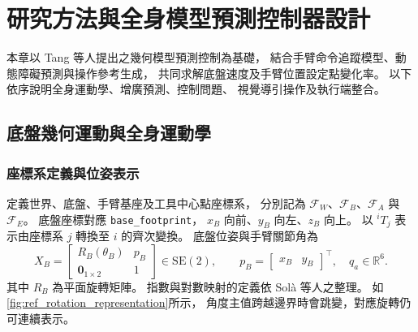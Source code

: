 \chapter{研究方法與全身模型預測控制器設計}
\label{c:methodology}
\label{c:Mathodology}

本章以 Tang 等人\cite{tang2024gmpc}提出之幾何模型預測控制為基礎，
結合手臂命令追蹤模型、動態障礙預測與操作參考生成，
共同求解底盤速度及手臂位置設定點變化率。
以下依序說明全身運動學、增廣預測、控制問題、
視覺導引操作及執行端整合。

\section{底盤幾何運動與全身運動學}
\label{sec:wholebody_kinematics}

\subsection{座標系定義與位姿表示}
\label{subsec:frames_pose_representation}

定義世界、底盤、手臂基座及工具中心點座標系，
分別記為 $\mathcal F_W$、$\mathcal F_B$、$\mathcal F_A$ 與 $\mathcal F_E$。
底盤座標對應 \texttt{base\_footprint}，
$x_B$ 向前、$y_B$ 向左、$z_B$ 向上。
以 $ {}^iT_j$ 表示由座標系 $j$ 轉換至 $i$ 的齊次變換。
底盤位姿與手臂關節角為
\begin{equation}
    X_B=
    \begin{bmatrix}
        R_B(\theta_B)&p_B\\
        \mathbf 0_{1\times2}&1
    \end{bmatrix}\in\mathrm{SE}(2),
    \qquad
    p_B=\begin{bmatrix}x_B&y_B\end{bmatrix}^{\top},
    \quad q_a\in\mathbb R^6 .
    \label{eq:ch3_base_pose}
\end{equation}
其中 $R_B$ 為平面旋轉矩陣。
指數與對數映射的定義依 Sol\`a 等人\cite{sola2018micro}之整理。
如\cref{fig:ref_rotation_representation}所示，
角度主值跨越邊界時會跳變，對應旋轉仍可連續表示。

